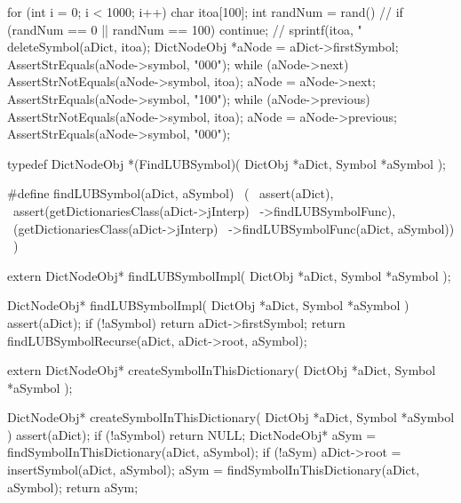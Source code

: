   for (int i = 0; i < 1000; i++) {
    char itoa[100];
    int randNum = rand() %
    //
    if (randNum == 0 || randNum == 100) continue;
    //
    sprintf(itoa, "%
    deleteSymbol(aDict, itoa);
    DictNodeObj *aNode = aDict->firstSymbol;
    AssertStrEquals(aNode->symbol, "000");
    while (aNode->next) {
      AssertStrNotEquals(aNode->symbol, itoa);
      aNode = aNode->next;
    }
    AssertStrEquals(aNode->symbol, "100");   
    while (aNode->previous) {
      AssertStrNotEquals(aNode->symbol, itoa);
      aNode = aNode->previous;
    }
    AssertStrEquals(aNode->symbol, "000");
  }  
\stopCTest
\stopTestCase
\stopTestSuite

\startTestSuite[findLUBSymbol]
\startCHeader
typedef DictNodeObj *(FindLUBSymbol)(
  DictObj *aDict,
  Symbol  *aSymbol
);

#define findLUBSymbol(aDict, aSymbol)           \
  (                                             \
    assert(aDict),                              \
    assert(getDictionariesClass(aDict->jInterp) \
      ->findLUBSymbolFunc),                     \
    (getDictionariesClass(aDict->jInterp)       \
      ->findLUBSymbolFunc(aDict, aSymbol))      \
  )
\stopCHeader

\setCHeaderStream{private}
\startCHeader
extern DictNodeObj* findLUBSymbolImpl(
  DictObj *aDict,
  Symbol  *aSymbol
);
\stopCHeader
\setCHeaderStream{public}

\startCCode
DictNodeObj* findLUBSymbolImpl(
  DictObj *aDict,
  Symbol  *aSymbol
) {
  assert(aDict);
  if (!aSymbol) return aDict->firstSymbol;
  return findLUBSymbolRecurse(aDict, aDict->root, aSymbol);
}
\stopCCode
\stopTestSuite

\startTestSuite[createSymbolInThisDictionary]

\setCHeaderStream{private}
\startCHeader
extern DictNodeObj* createSymbolInThisDictionary(
  DictObj *aDict,
  Symbol  *aSymbol
);
\stopCHeader
\setCHeaderStream{public}

\startCCode
DictNodeObj* createSymbolInThisDictionary(
  DictObj *aDict,
  Symbol  *aSymbol
) {
  assert(aDict);
  if (!aSymbol) return NULL;
  DictNodeObj* aSym =
    findSymbolInThisDictionary(aDict, aSymbol);
  if (!aSym) {
    aDict->root = insertSymbol(aDict, aSymbol);
    aSym = findSymbolInThisDictionary(aDict, aSymbol);
  }
  return aSym;
}
\stopCCode
\stopTestSuite

\startTestSuite[getSymbolEntry]

